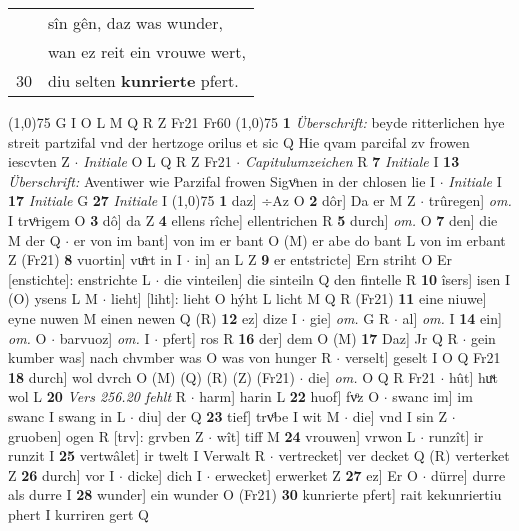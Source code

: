 \documentclass[8pt,a4paper,notitlepage]{article}
\begin{document}
\begin{table}[ht]
\begin{minipage}[t]{0.5\linewidth}
\begin{tabular}{rl}
 & sîn gên, daz was wunder,\\ 
 & wan ez reit ein vrouwe wert,\\ 
30 & diu selten \textbf{kunrierte} pfert.\\ 
\end{tabular}
\scriptsize
\line(1,0){75} \newline
G I O L M Q R Z Fr21 Fr60 \newline
\line(1,0){75} \newline
\textbf{1} \textit{Überschrift:} beyde ritterlichen hye streit partzifal vnd der hertzoge orilus et sic Q  Hie qvam parcifal zv frowen iescvten Z   $\cdot$ \textit{Initiale} O L Q R Z Fr21   $\cdot$ \textit{Capitulumzeichen} R  \textbf{7} \textit{Initiale} I  \textbf{13} \textit{Überschrift:} Aventiwer wie Parzifal frowen Sigvͦnen in der chlosen lie I   $\cdot$ \textit{Initiale} I  \textbf{17} \textit{Initiale} G  \textbf{27} \textit{Initiale} I  \newline
\line(1,0){75} \newline
\textbf{1} daz] ÷Az O \textbf{2} dôr] Da er M Z  $\cdot$ trûregen] \textit{om.} I trvͦrigem O \textbf{3} dô] da Z \textbf{4} ellens rîche] ellentrichen R \textbf{5} durch] \textit{om.} O \textbf{7} den] die M der Q  $\cdot$ er von im bant] von im er bant O (M) er abe do bant L von im erbant Z (Fr21) \textbf{8} vuortin] vuͤrt in I  $\cdot$ in] an L Z \textbf{9} er entstricte] Ern striht O Er [enstichte]: enstrichte L  $\cdot$ die vinteilen] die sinteiln Q den fintelle R \textbf{10} îsers] isen I (O) ysens L M  $\cdot$ lieht] [liht]: lieht O hýht L licht M Q R (Fr21) \textbf{11} eine niuwe] eyne nuwen M einen newen Q (R) \textbf{12} ez] dize I  $\cdot$ gie] \textit{om.} G R  $\cdot$ al] \textit{om.} I \textbf{14} ein] \textit{om.} O  $\cdot$ barvuoz] \textit{om.} I  $\cdot$ pfert] ros R \textbf{16} der] dem O (M) \textbf{17} Daz] Jr Q R  $\cdot$ gein kumber was] nach chvmber was O was von hunger R  $\cdot$ verselt] geselt I O Q Fr21 \textbf{18} durch] wol dvrch O (M) (Q) (R) (Z) (Fr21)  $\cdot$ die] \textit{om.} O Q R Fr21  $\cdot$ hût] huͯt wol L \textbf{20} \textit{Vers 256.20 fehlt} R   $\cdot$ harm] harin L \textbf{22} huof] fvͦz O  $\cdot$ swanc im] im swanc I swang in L  $\cdot$ diu] der Q \textbf{23} tief] trvͦbe I wit M  $\cdot$ die] vnd I sin Z  $\cdot$ gruoben] ogen R [trv]: grvben Z  $\cdot$ wît] tiff M \textbf{24} vrouwen] vrwon L  $\cdot$ runzît] ir runzit I \textbf{25} vertwâlet] ir twelt I Verwalt R  $\cdot$ vertrecket] ver decket Q (R) verterket Z \textbf{26} durch] vor I  $\cdot$ dicke] dich I  $\cdot$ erwecket] erwerket Z \textbf{27} ez] Er O  $\cdot$ dürre] durre als durre I \textbf{28} wunder] ein wunder O (Fr21) \textbf{30} kunrierte pfert] rait kekunriertiu phert I kurriren gert Q \newline

\end{minipage}
\end{table}
\end{document}

